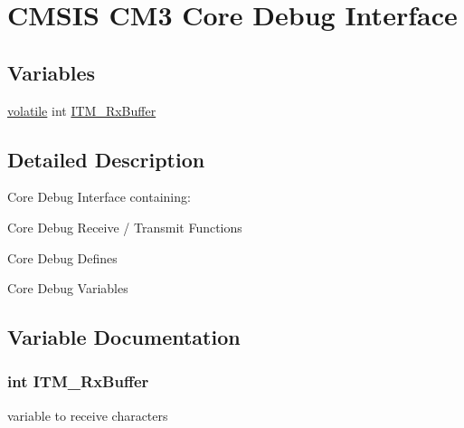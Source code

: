 \hypertarget{group___c_m_s_i_s___c_m3___core_debug_interface}{\section{C\-M\-S\-I\-S C\-M3 Core Debug Interface}
\label{group___c_m_s_i_s___c_m3___core_debug_interface}
}
\subsection*{Variables}
\begin{DoxyCompactItemize}
\item 
\hyperlink{group___c_m_s_i_s___core___instruction_interface_gad7d93af13046b0378601b85c8c16673b}{volatile} int \hyperlink{group___c_m_s_i_s___c_m3___core_debug_interface_gacf1fe3063cedf11b6e6f7cb0dd7c1a51}{I\-T\-M\-\_\-\-Rx\-Buffer}
\end{DoxyCompactItemize}


\subsection{Detailed Description}
Core Debug Interface containing\-:
\begin{DoxyItemize}
\item Core Debug Receive / Transmit Functions
\item Core Debug Defines
\item Core Debug Variables 
\end{DoxyItemize}

\subsection{Variable Documentation}
\hypertarget{group___c_m_s_i_s___c_m3___core_debug_interface_gacf1fe3063cedf11b6e6f7cb0dd7c1a51}{
\subsubsection[{I\-T\-M\-\_\-\-Rx\-Buffer}]{ int I\-T\-M\-\_\-\-Rx\-Buffer}}\label{group___c_m_s_i_s___c_m3___core_debug_interface_gacf1fe3063cedf11b6e6f7cb0dd7c1a51}
variable to receive characters 